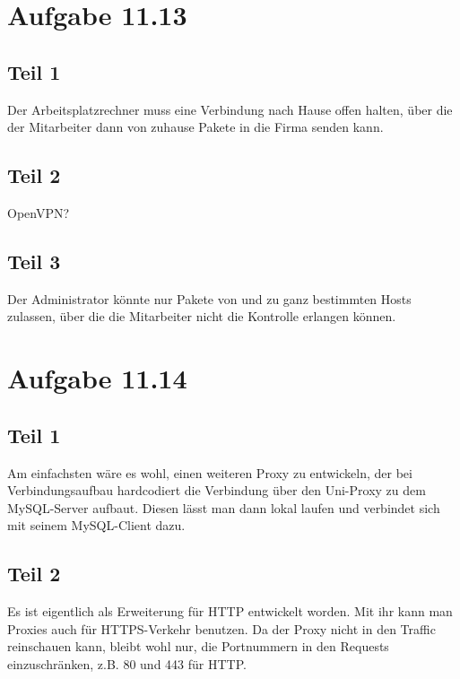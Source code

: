 \documentclass[10pt,a4paper]{article}
\begin{document}
\section{Aufgabe 11.13}

\subsection{Teil 1}

Der Arbeitsplatzrechner muss eine Verbindung nach Hause offen halten, über die
der Mitarbeiter dann von zuhause Pakete in die Firma senden kann.

\subsection{Teil 2}

OpenVPN?

\subsection{Teil 3}

Der Administrator könnte nur Pakete von und zu ganz bestimmten Hosts zulassen,
über die die Mitarbeiter nicht die Kontrolle erlangen können.

\section{Aufgabe 11.14}

\subsection{Teil 1}

Am einfachsten wäre es wohl, einen weiteren Proxy zu entwickeln, der bei
Verbindungsaufbau hardcodiert die Verbindung über den Uni-Proxy zu dem
MySQL-Server aufbaut. Diesen lässt man dann lokal laufen und verbindet sich mit
seinem MySQL-Client dazu.

\subsection{Teil 2}

Es ist eigentlich als Erweiterung für HTTP entwickelt worden. Mit ihr kann man
Proxies auch für HTTPS-Verkehr benutzen. Da der Proxy nicht in den Traffic
reinschauen kann, bleibt wohl nur, die Portnummern in den Requests
einzuschränken, z.B. 80 und 443 für HTTP.
\end{document}
